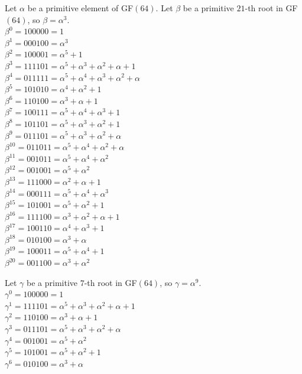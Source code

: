 \begin{mdframed}[style=MyFrame]

\noindent Let $\alpha$ be a primitive element of GF$(64)$. 
Let $\beta$ be a primitive $21$-th root in GF$(64)$, 
so $\beta=\alpha^{3}.$ \\
$\beta^{0} = 100000 =  1$\\
$\beta^{1} = 000100 =  \alpha^{3}$\\
$\beta^{2} = 100001 =  \alpha^{5} + 1$\\
$\beta^{3} = 111101 =  \alpha^{5} + \alpha^{3} + \alpha^{2} + \alpha + 1$\\
$\beta^{4} = 011111 =  \alpha^{5} + \alpha^{4} + \alpha^{3} + \alpha^{2} + \alpha$\\
$\beta^{5} = 101010 =  \alpha^{4} + \alpha^{2} + 1$\\
$\beta^{6} = 110100 =  \alpha^{3} + \alpha + 1$\\
$\beta^{7} = 100111 =  \alpha^{5} + \alpha^{4} + \alpha^{3} + 1$\\
$\beta^{8} = 101101 =  \alpha^{5} + \alpha^{3} + \alpha^{2} + 1$\\
$\beta^{9} = 011101 =  \alpha^{5} + \alpha^{3} + \alpha^{2} + \alpha$\\
$\beta^{10} = 011011 =  \alpha^{5} + \alpha^{4} + \alpha^{2} + \alpha$\\
$\beta^{11} = 001011 =  \alpha^{5} + \alpha^{4} + \alpha^{2}$\\
$\beta^{12} = 001001 =  \alpha^{5} + \alpha^{2}$\\
$\beta^{13} = 111000 =  \alpha^{2} + \alpha + 1$\\
$\beta^{14} = 000111 =  \alpha^{5} + \alpha^{4} + \alpha^{3}$\\
$\beta^{15} = 101001 =  \alpha^{5} + \alpha^{2} + 1$\\
$\beta^{16} = 111100 =  \alpha^{3} + \alpha^{2} + \alpha + 1$\\
$\beta^{17} = 100110 =  \alpha^{4} + \alpha^{3} + 1$\\
$\beta^{18} = 010100 =  \alpha^{3} + \alpha$\\
$\beta^{19} = 100011 =  \alpha^{5} + \alpha^{4} + 1$\\
$\beta^{20} = 001100 =  \alpha^{3} + \alpha^{2}$\\
\bigskip

\noindent Let $\gamma$ be a primitive $7$-th root in GF$(64)$, 
so $\gamma=\alpha^{9}.$ \\
$\gamma^{0} = 100000 = 1$\\
$\gamma^{1} = 111101 = \alpha^{5} + \alpha^{3} + \alpha^{2} + \alpha + 1$\\
$\gamma^{2} = 110100 = \alpha^{3} + \alpha + 1$\\
$\gamma^{3} = 011101 = \alpha^{5} + \alpha^{3} + \alpha^{2} + \alpha$\\
$\gamma^{4} = 001001 = \alpha^{5} + \alpha^{2}$\\
$\gamma^{5} = 101001 = \alpha^{5} + \alpha^{2} + 1$\\
$\gamma^{6} = 010100 = \alpha^{3} + \alpha$\\
\bigskip


\end{mdframed}
